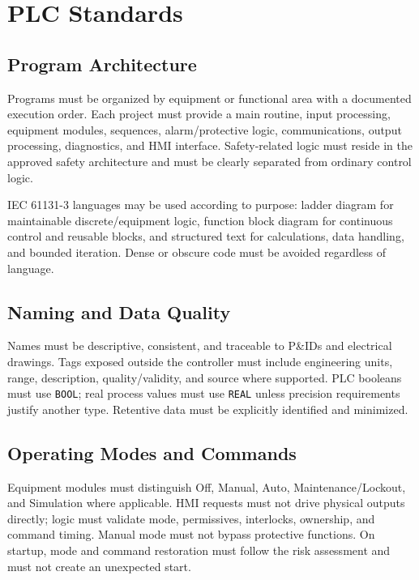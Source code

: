 \chapter{PLC Standards}
\section{Program Architecture}
Programs must be organized by equipment or functional area with a documented execution order. Each project must provide a main routine, input processing, equipment modules, sequences, alarm/protective logic, communications, output processing, diagnostics, and HMI interface. Safety-related logic must reside in the approved safety architecture and must be clearly separated from ordinary control logic.

IEC 61131-3 languages may be used according to purpose: ladder diagram for maintainable discrete/equipment logic, function block diagram for continuous control and reusable blocks, and structured text for calculations, data handling, and bounded iteration. Dense or obscure code must be avoided regardless of language.

\section{Naming and Data Quality}
Names must be descriptive, consistent, and traceable to P\&IDs and electrical drawings. Tags exposed outside the controller must include engineering units, range, description, quality/validity, and source where supported. PLC booleans must use \texttt{BOOL}; real process values must use \texttt{REAL} unless precision requirements justify another type. Retentive data must be explicitly identified and minimized.

\section{Operating Modes and Commands}
Equipment modules must distinguish Off, Manual, Auto, Maintenance/Lockout, and Simulation where applicable. HMI requests must not drive physical outputs directly; logic must validate mode, permissives, interlocks, ownership, and command timing. Manual mode must not bypass protective functions. On startup, mode and command restoration must follow the risk assessment and must not create an unexpected start.

